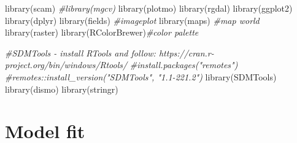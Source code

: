 \documentclass[
]{book}
\newenvironment{Shaded}{\begin{snugshade}}{\end{snugshade}}
\newcommand{\CommentTok}[1]{\textcolor[rgb]{0.56,0.35,0.01}{\textit{#1}}}
\newcommand{\FunctionTok}[1]{\textcolor[rgb]{0.00,0.00,0.00}{#1}}
\newcommand{\NormalTok}[1]{#1}
\begin{document}
\begin{Shaded}
\begin{Highlighting}[]
\FunctionTok{library}\NormalTok{(scam)}
\CommentTok{\#library(mgcv)}
\FunctionTok{library}\NormalTok{(plotmo)}
\FunctionTok{library}\NormalTok{(rgdal)}
\FunctionTok{library}\NormalTok{(ggplot2)}
\FunctionTok{library}\NormalTok{(dplyr)}
\FunctionTok{library}\NormalTok{(fields) }\CommentTok{\#imageplot}
\FunctionTok{library}\NormalTok{(maps) }\CommentTok{\#map world}
\FunctionTok{library}\NormalTok{(raster)}
\FunctionTok{library}\NormalTok{(RColorBrewer)}\CommentTok{\#color palette}

\CommentTok{\#SDMTools {-} install RTools and follow: https://cran.r{-}project.org/bin/windows/Rtools/}
\CommentTok{\#install.packages("remotes")}
\CommentTok{\#remotes::install\_version("SDMTools", "1.1{-}221.2")}
\FunctionTok{library}\NormalTok{(SDMTools)}
\FunctionTok{library}\NormalTok{(dismo)}
\FunctionTok{library}\NormalTok{(stringr)}
\end{Highlighting}
\end{Shaded}

\hypertarget{model-fit}{%
\section{Model fit}\label{model-fit}}
\end{document}
